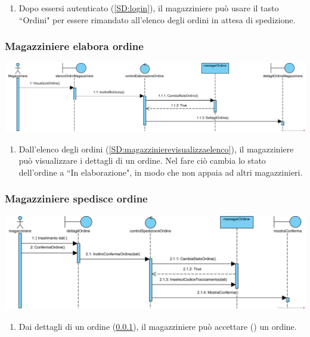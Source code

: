 \documentclass[12pt,a4paper]{article}
\begin{document}
\begin{enumerate}
\item Dopo essersi autenticato (\ref{SD:login}), il magazziniere può usare il tasto ``Ordini" per essere rimandato all'elenco degli ordini in attesa di spedizione.
\end{enumerate}

\subsubsection{Magazziniere elabora ordine}
\label{SD:magazziniereblocca}
\begin{center}
\includegraphics[width=\textwidth]{SequenceDiagram/MagazziniereOrdineVisualizza}
\end{center}

\begin{enumerate}
\item Dall'elenco degli ordini (\ref{SD:magazzinierevisualizzaelenco}), il magazziniere può visualizzare i dettagli di un ordine. Nel fare ciò cambia lo stato dell'ordine a ``In elaborazione", in modo che non appaia ad altri magazzinieri.
\end{enumerate}

\subsubsection{Magazziniere spedisce ordine}
\label{SD:magazzinierespedisce}
\begin{center}
\includegraphics[width=\textwidth]{SequenceDiagram/MagazziniereOrdineSpedisce}
\end{center}

\begin{enumerate}
\item Dai dettagli di un ordine (\ref{SD:magazziniereblocca}), il magazziniere può accettare (\checkmark) un ordine.
\end{enumerate}
\end{document}
